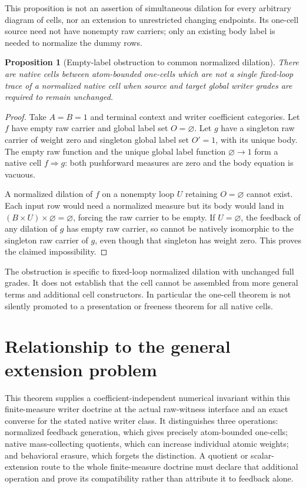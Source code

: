 \documentclass[11pt]{article}
\newtheorem{proposition}[theorem]{Proposition}
\begin{document}
This proposition is not an assertion of simultaneous dilation for every arbitrary diagram of cells, nor an extension to unrestricted changing endpoints. Its one-cell source need not have nonempty raw carriers; only an existing body label is needed to normalize the dummy rows.

\begin{proposition}[Empty-label obstruction to common normalized dilation]
There are native cells between atom-bounded one-cells which are not a single fixed-loop trace of a normalized native cell when source and target global writer grades are required to remain unchanged.
\end{proposition}
\begin{proof}
Take $A=B=1$ and terminal context and writer coefficient categories. Let $f$ have empty raw carrier and global label set $O=\varnothing$. Let $g$ have a singleton raw carrier of weight zero and singleton global label set $O'=1$, with its unique body. The empty raw function and the unique global label function $\varnothing\to1$ form a native cell $f\Rightarrow g$: both pushforward measures are zero and the body equation is vacuous.

A normalized dilation of $f$ on a nonempty loop $U$ retaining $O=\varnothing$ cannot exist. Each input row would need a normalized measure but its body would land in $(B\times U)\times\varnothing=\varnothing$, forcing the raw carrier to be empty. If $U=\varnothing$, the feedback of any dilation of $g$ has empty raw carrier, so cannot be natively isomorphic to the singleton raw carrier of $g$, even though that singleton has weight zero. This proves the claimed impossibility.
\end{proof}
The obstruction is specific to fixed-loop normalized dilation with unchanged full grades. It does not establish that the cell cannot be assembled from more general terms and additional cell constructors. In particular the one-cell theorem is not silently promoted to a presentation or freeness theorem for all native cells.

\section{Relationship to the general extension problem}
This theorem supplies a coefficient-independent numerical invariant within this finite-measure writer doctrine at the actual raw-witness interface and an exact converse for the stated native writer class. It distinguishes three operations: normalized feedback generation, which gives precisely atom-bounded one-cells; native mass-collecting quotients, which can increase individual atomic weights; and behavioral erasure, which forgets the distinction. A quotient or scalar-extension route to the whole finite-measure doctrine must declare that additional operation and prove its compatibility rather than attribute it to feedback alone.
\end{document}
